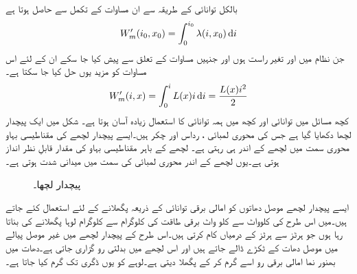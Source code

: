 بالکل توانائی کے طریقہ سے ان مساوات کے تکمل سے حاصل ہوتا ہے
\begin{align}
W_m'(i_0,x_0)=\int_{0}^{i_0} \lambda(i,x_0) \dif i
\end{align}
جن نظام میں  اور  تغیر راست ہوں اور جنہیں مساوات  کے تعلق سے پیش کیا جا سکے ان کے لئے اس مساوات کو مزید یوں حل کیا جا سکتا ہے۔
\begin{align}\label{مساوات_تبادلہ_کوتوانائی_مساوی_امالہ_مربع_رو}
W_m'(i,x)=\int_{0}^{i} L(x) i  \dif i=\frac{L(x) i^2}{2}
\end{align}
کچھ مسائل میں توانائی اور  کچھ میں ہمہ توانائی کا استعمال زیادہ آسان ہوتا ہے۔
%
شکل   میں ایک پیچدار لچھا دکھایا گیا ہے جس کی محوری لمبائی ،   رداس   اور چکر   ہیں۔ایسے پیچدار لچھے کی مقناطیسی بہاو محوری سمت میں لچھے کے اندر ہی رہتی ہے۔ لچھے کے باہر مقناطیسی بہاو کی مقدار قابلِ نظر انداز ہوتی ہے۔یوں لچھے کے اندر محوری لمبائی کی سمت میں میدانی شدت  ہوتی ہے۔
\begin{figure}
\centering
%

\caption{پیچدار لچھا۔}
\label{شکل_تبادلہ_توانائی_پیچدار_لچھا}
\end{figure}

ایسے پیچدار لچھے موصل دھاتوں کو امالی برقی توانائی کے ذریعہ پگھلانے کے لئے استعمال کئے جاتے ہیں۔میں اس طرح کی   کلوواٹ سے   کلو واٹ برقی طاقت کی   کلوگرام سے   کلوگرام  لوہا پگھلانے کی  بناتا رہا ہوں جو  ہرٹز سے   ہرٹز کے درمیاں کام کرتی ہیں۔اس طرح کے پیچدار لچھے میں غیر موصل پیالے میں موصل دھات کے ٹکڑے ڈالے جاتے ہیں اور اس لچھے میں بدلتی رو گزاری جاتی ہے۔دھات میں بھنور نما امالی برقی رو اسے گرم کر کے پگھلا دیتی ہے۔لوہے کو یوں   ڈگری  تک گرم کیا جاتا ہے۔

